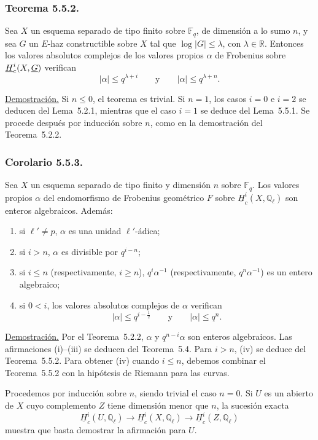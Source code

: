 \subsubsection*{Teorema 5.5.2.}
Sea $X$ un esquema separado de tipo finito sobre $\mathbb F_q$, de
dimensión a lo sumo $n$, y sea $G$ un $E$-haz constructible
sobre $X$ tal que $\log|G|\leq\lambda$, con
$\lambda\in\mathbb R$. Entonces los valores absolutos complejos de los
valores propios $\alpha$ de Frobenius sobre
$\sisi{H}{\underline H}_c^i(X,\underline G)$ verifican
\[
|\alpha|\leq q^{\lambda+i}
\qquad\text{y}\qquad
|\alpha|\leq q^{\lambda+n}.
\]

\pageoriginale

\noindent\underline{Demostración.}
Si $n\leq0$, el teorema es trivial. Si $n=1$, los casos $i=0$ e $i=2$
se deducen del Lema~5.2.1, mientras que el caso $i=1$ se deduce del
Lema~5.5.1. Se procede después por inducción sobre $n$, como en la
demostración del Teorema~5.2.2.

\subsubsection*{Corolario 5.5.3.}
Sea $X$ un esquema separado de tipo finito y dimensión $n$ sobre
$\mathbb F_q$. Los valores propios $\alpha$ del endomorfismo de Frobenius
geométrico $F$ sobre $\underline H_c^i(X,\mathbb Q_\ell)$ son enteros
algebraicos. Además:
\begin{enumerate}[label=(\roman*)]
\item si $\ell'\ne p$, $\alpha$ es una unidad $\ell'$-ádica;
\item si $i>n$, $\alpha$ es divisible por $q^{i-n}$;
\item si $i\leq n$ (respectivamente, $i\geq n$),
  $q^i\alpha^{-1}$ (respectivamente, $q^n\alpha^{-1}$) es un entero
  algebraico;
\item si $0<i$, los valores absolutos complejos de $\alpha$ verifican
  \[
  |\alpha|\leq q^{i-\frac12}
  \qquad\text{y}\qquad
  |\alpha|\leq q^n.
  \]
\end{enumerate}

\noindent\underline{Demostración.}
Por el Teorema~5.2.2, $\alpha$ y $q^{n-i}\alpha$ son enteros algebraicos.
Las afirmaciones (i)--(iii) se deducen del Teorema~5.4. Para $i>n$, (iv)
se deduce del Teorema~5.5.2. Para obtener (iv) cuando $i\leq n$, debemos
combinar el Teorema~5.5.2 con la hipótesis de Riemann para las curvas.

Procedemos por inducción sobre $n$, siendo trivial el caso $n=0$. Si $U$
es un abierto de $X$ cuyo complemento $Z$ tiene dimensión menor que $n$,
la sucesión exacta
\[
\underline H_c^i(U,\mathbb Q_\ell)\longrightarrow
\underline H_c^i(X,\mathbb Q_\ell)\longrightarrow
\underline H_c^i(Z,\mathbb Q_\ell)
\]
muestra que basta demostrar la afirmación para $U$.

